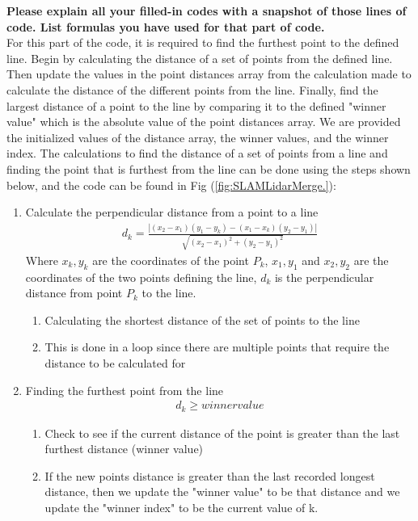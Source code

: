 \textbf{Please explain all your filled-in codes with a snapshot of those lines of code. List formulas you have used for that part of code.}\\
For this part of the code, it is required to find the furthest point to the defined line. Begin by calculating the distance of a set of points from the defined line. Then update the values in the point distances array from the calculation made to calculate the distance of the different points from the line. Finally, find the largest distance of a point to the line by comparing it to the defined "winner value" which is the absolute value of the point distances array. We are provided the initialized values of the distance array, the winner values, and the winner index. The calculations to find the distance of a set of points from a line and finding the point that is furthest from the line can be done using the steps shown below, and the code can be found in Fig (\ref{fig:SLAMLidarMerge.}):\\
\begin{enumerate}
    \item Calculate the perpendicular distance from a point to a line
    \begin{align}
    d_k = \frac{|(x_2 - x_1)(y_1 - y_k) - (x_1 - x_k)(y_2 - y_1)|}{\sqrt{(x_2 - x_1)^2 + (y_2 - y_1)^2}}
    \end{align}
    Where $x_k, y_k$ are the coordinates of the point $P_k$, $x_1, y_1$ and $x_2, y_2$ are the coordinates of the two points defining the line, $d_k$ is the perpendicular distance from point $P_k$ to the line.
    \begin{enumerate}
        \item Calculating the shortest distance of the set of points to the line
        \item This is done in a loop since there are multiple points that require the distance to be calculated for
    \end{enumerate}
    \item Finding the furthest point from the line
    \begin{align*}
        d_k \geq winner value
    \end{align*}
    \begin{enumerate}
        \item Check to see if the current distance of the point is greater than the last furthest distance (winner value)
        \item If the new points distance is greater than the last recorded longest distance, then we update the "winner value" to be that distance and we update the "winner index" to be the current value of k.
    \end{enumerate}
\end{enumerate}

